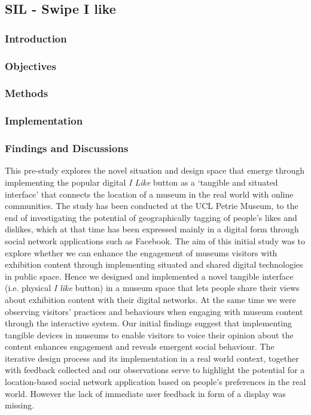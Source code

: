 \subsection{SIL - Swipe I like}


\subsubsection {Introduction} 
\subsubsection {Objectives} 
\subsubsection {Methods}
\subsubsection {Implementation}
\subsubsection {Findings and Discussions}

This pre-study explores the novel situation and design space that emerge through implementing the popular digital \textit{I Like} button as a ‘tangible and situated interface’ that connects the location of a museum in the real world with online communities. 
The study has been conducted at the UCL Petrie Museum, to the end of investigating the potential of geographically tagging of people’s likes and dislikes, which at that time has been expressed mainly in a digital form through social network applications such as Facebook. 
The aim of this initial study was to explore whether we can enhance the engagement of museums visitors with exhibition content through implementing situated and shared digital technologies in public space. 
Hence we designed and implemented a novel tangible interface (i.e. physical \textit{I like} button) in a museum space that lets people share their views about exhibition content with their digital networks. At the same time we were observing visitors' practices and behaviours when engaging with museum content through the interactive system. 
Our initial findings suggest that implementing tangible devices in museums to enable visitors to voice their opinion about the content enhances engagement and reveals emergent social behaviour. 
The iterative design process and its implementation in a real world context, together with feedback collected and our observations serve to highlight the potential for a location-based social network application based on people’s preferences in the real world.
However the lack of immediate user feedback in form of a display was missing.

